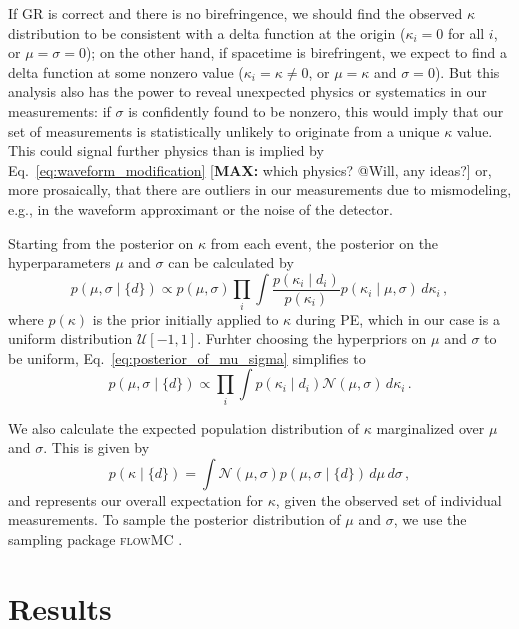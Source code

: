 \documentclass[aps,prd,twocolumn,superscriptaddress,preprintnumbers,floatfix,nofootinbib]{revtex4-2}
\newcommand*{\mi}[1]{\textsf{\color{magenta} [\textbf{MAX:} #1]}}
\begin{document}
If \ac{GR} is correct and there is no birefringence, we should find the observed $\kappa$ distribution to be consistent with a delta function at the origin ($\kappa_i = 0$ for all $i$, or $\mu=\sigma=0$); on the other hand, if spacetime is birefringent, we expect to find a delta function at some nonzero value ($\kappa_i = \kappa \neq 0$, or $\mu = \kappa$ and $\sigma=0$).
But this analysis also has the power to reveal unexpected physics or systematics in our measurements: if $\sigma$ is confidently found to be nonzero, this would imply that our set of measurements is statistically unlikely to originate from a unique $\kappa$ value.
This could signal further physics than is implied by Eq.~\eqref{eq:waveform_modification} \mi{which physics? @Will, any ideas?} or, more prosaically, that there are outliers in our measurements due to mismodeling, e.g., in the waveform approximant or the noise of the detector.

Starting from the posterior on $\kappa$ from each event, the posterior on the hyperparameters $\mu$ and $\sigma$ can be calculated by
\begin{equation}
    p(\mu,\sigma \mid \{d\})\propto p(\mu,\sigma)\prod_{i}\int\frac{p(\kappa_i\mid d_i)}{p(\kappa_i)}p(\kappa_i\mid\mu,\sigma)\,d\kappa_i\,,
    \label{eq:posterior_of_mu_sigma}
\end{equation}
where $p(\kappa)$ is the prior initially applied to $\kappa$ during \ac{PE}, which in our case is a uniform distribution $\mathcal{U}[-1,1]$.
Furhter choosing the hyperpriors on $\mu$ and $\sigma$ to be uniform, Eq.~\eqref{eq:posterior_of_mu_sigma} simplifies to
\begin{equation}
    p(\mu,\sigma\mid\{d\})\propto\prod_{i}\int p(\kappa_i\mid d_i)\mathcal{N}(\mu,\sigma)\,d\kappa_i\,.
\end{equation}

We also calculate the expected population distribution of $\kappa$ marginalized over $\mu$ and $\sigma$.
This is given by
\begin{equation}
            p(\kappa\mid \{d\})=\int \mathcal{N}(\mu,\sigma)p(\mu,\sigma\mid \{d\})\,d\mu\,d\sigma\, , 
    \label{eq:generic_posterior}
\end{equation}
and represents our overall expectation for $\kappa$, given the observed set of individual measurements.
To sample the posterior distribution of $\mu$ and $\sigma$, we use the sampling package \textsc{flowMC} \citep{flowMC}.

\section{Results}
\label{sec:Results}
\end{document}
